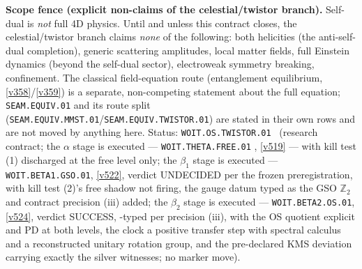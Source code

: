 \documentclass[11pt,a4paper]{article}
\newcommand{\Z}{\mathbb Z}
\begin{document}
\par\smallskip\noindent\textbf{Scope fence (explicit non-claims of the celestial/twistor branch).}
Self-dual is \emph{not} full 4D physics. Until and unless this contract closes, the celestial/twistor
branch claims \emph{none} of the following: both helicities (the anti-self-dual completion), generic
scattering amplitudes, local matter fields, full Einstein dynamics (beyond the self-dual sector),
electroweak symmetry breaking, confinement. The classical field-equation route (entanglement
equilibrium, \vref{v358}/\vref{v359}) is a separate, non-competing statement about the full equation;
\texttt{SEAM.EQUIV.01} and its route split (\texttt{SEAM.EQUIV.MMST.01}/\texttt{SEAM.EQUIV.TWISTOR.01})
are stated in their own rows and are not moved by anything here. Status:
\texttt{WOIT.OS.TWISTOR.01} \mO\ (research contract; the $\alpha$ stage is executed ---
\texttt{WOIT.THETA.FREE.01} \mE, \vref{v519} --- with kill test (1) discharged at the free level
only; the $\beta_1$ stage is executed --- \texttt{WOIT.BETA1.GSO.01}, \vref{v522}, verdict
UNDECIDED per the frozen preregistration, with kill test (2)'s free shadow not firing, the
gauge datum typed as the GSO $\Z_2$ and contract precision (iii) added; the $\beta_2$ stage
is executed --- \texttt{WOIT.BETA2.OS.01}, \vref{v524}, verdict SUCCESS, \mC-typed per
precision (iii), with the OS quotient explicit and PD at both levels, the clock a positive
transfer step with spectral calculus and a reconstructed unitary rotation group, and the
pre-declared KMS deviation carrying exactly the silver witnesses; no marker move).

\end{document}
